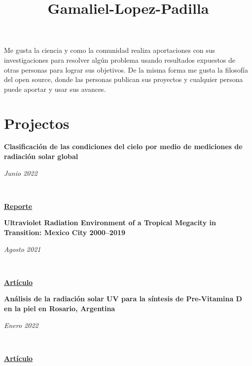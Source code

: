 \documentclass[a3paper]{adcv_color}
\title{Gamaliel-Lopez-Padilla}
\newcommand{\proyect}[3]{\begin{minipage}{1\linewidth}
		\begin{minipage}{0.8\linewidth}
			\textbf{#1}
		\end{minipage}
		\begin{minipage}{0.19\linewidth}
			\begin{flushright}
				\vspace{#3cm}
				\textit{#2}
			\end{flushright}
		\end{minipage}\\
	\end{minipage}
}
\begin{document}
\changefontsizes{16pt}

Me gusta la ciencia y como la comunidad realiza  aportaciones con sus investigaciones para resolver algún problema usando resultados expuestos de otras personas para lograr sus objetivos. De la misma forma me gusta la filosofía del open source, donde las personas publican sus proyectos y cualquier persona puede aportar y usar sus avances.

\section{Projectos}

\proyect{Clasificación de las condiciones del cielo por medio de mediciones de radiación solar global}{Junio 2022}{-0.8}\href{https://github.com/giovannilopez9808/Cloud_classification/raw/main/Document/Main.pdf}{\textbf{Reporte}}
\vspace{0.05cm}\\

\proyect{Ultraviolet Radiation Environment of a Tropical Megacity in Transition: Mexico City 2000–2019}{Agosto 2021}{-0.6}
\href{https://pubs.acs.org/doi/10.1021/acs.est.0c08515}{\textbf{Artículo}}
\vspace{0.05cm}\\

\proyect{Análisis de la radiación solar UV para la síntesis de Pre-Vitamina D en la piel en Rosario, Argentina}{Enero 2022}{-0.8}
\href{https://anales.fisica.org.ar/journal/index.php/analesafa/article/view/2318}{\textbf{Artículo}}
\vspace{0.05cm}\\

\end{document}
